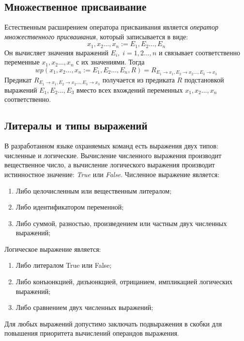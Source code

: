\subsection{Множественное присваивание}
	Естественным расширением оператора присваивания является \textit{оператор множественного присваивания},
	который записывается в виде:
\begin{equation}
	x_1, x_2 \ldots, x_n := E_1, E_2 \ldots, E_n
\end{equation}
	Он вычисляет значения выражений $E_i, \; i=1,2\ldots, n$ и связывает соответственно переменные $x_1, x_2 \ldots, x_n$ с
	их значениями. Тогда
	\begin{equation}
		wp(x_1, x_2 \ldots, x_n := E_1, E_2 \ldots, E_n, R) = R_{E_1\rightarrow x_1, E_2\rightarrow x_2 \ldots, E_3\rightarrow x_3} 
	\end{equation}
	Предикат $R_{E_1\rightarrow x_1, E_2\rightarrow x_2 \ldots, E_3\rightarrow x_3}$ получается из предиката $R$ подстановкой
	выражений $E_1, E_2 \ldots, E_3$ вместо всех вхождений переменных $x_1, x_2 \ldots, x_n$ соответственно.

\subsection{Литералы и типы выражений}
	В разработанном языке охраняемых команд есть выражения двух типов: численные и логические.
	Вычисление численного выражения производит вещественное число, а вычисление логического выражения
	производит истинностное значение: \textit{True} или \textit{False}.
	Численное выражение является:
	\begin{enumerate}
		\item Либо целочисленным или вещественным литералом;
		\item Либо идентификатором переменной;
		\item Либо суммой, разностью, произведением или частным двух численных выражений;
	\end{enumerate}
	
	Логическое выражение является:
	\begin{enumerate}
		\item Либо литералом True или False;
		\item Либо конъюнкцией, дизъюнкцией, отрицанием, импликацией логических выражений;
		\item Либо сравнением двух численных выражений;
	\end{enumerate}

	Для любых выражений допустимо заключать подвыражения в скобки для повышения приоритета вычислений
	операндов выражения.

